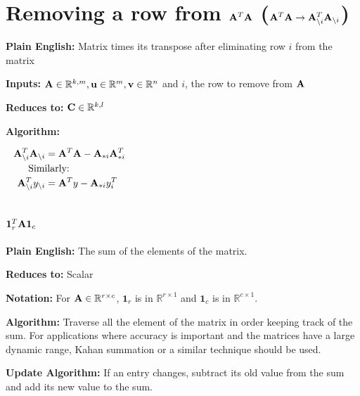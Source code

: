 \section{Removing a row from $\mathbf{A}^T\mathbf{A}$ ($\mathbf{A}^T\mathbf{A}\rightarrow \mathbf{A}_{\setminus i}^T\mathbf{A}_{\setminus i}$)}

\textbf{Plain English:} Matrix times its transpose after eliminating row $i$ from the matrix

\textbf{Inputs:} $\mathbf{A}\in\mathbb{R}^{k,m},\mathbf{u}\in\mathbb{R}^{m},\mathbf{v}\in\mathbb{R}^{n}$ and $i$, the row to remove from $\mathbf{A}$

\textbf{Reduces to:} $\mathbf{C}\in\mathbb{R}^{k,l}$

\textbf{Algorithm:}


\begin{align}
\mA_{\bs i}^T\mA_{\bs i} &= \mA^T\mA-\mA_{*i}\mA_{*i}^T \\
\noalign{Similarly:}
\mA_{\bs i}^T  y_{\bs i} &= \mA^Ty  -\mA_{*i}y_i^T
\end{align}


\section{$\mathbf{1}_r^T \mathbf{A} \mathbf{1}_c$}

\textbf{Plain English:} The sum of the elements of the matrix.

\textbf{Reduces to:} Scalar

\textbf{Notation:} For $\mathbf{A} \in \mathbb{R}^{r\times c}$, $\mathbf{1}_r$ is in $\mathbb{R}^{r \times 1}$ and $\mathbf{1}_c$ is in $\mathbb{R}^{c \times 1}$.

\textbf{Algorithm:} Traverse all the element of the matrix in order keeping track of the sum. For applications where accuracy is important and the matrices have a large dynamic range, Kahan summation or a similar technique should be used.

\textbf{Update Algorithm:} If an entry changes, subtract its old value from the sum and add its new value to the sum.


